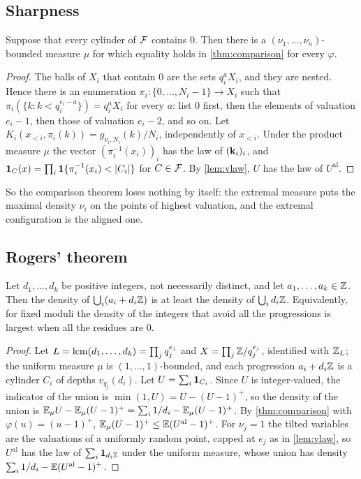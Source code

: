 \subsection{Sharpness}

\begin{proposition}\label{prop:sharp}
Suppose that every cylinder of $\mathcal{F}$ contains $0$. Then there is a $(\nu_1,\dots,\nu_n)$-bounded measure $\mu$ for
which equality holds in \cref{thm:comparison} for every $\varphi$.
\end{proposition}

\begin{proof}
The balls of $X_i$ that contain $0$ are the sets $q_i^aX_i$, and they are nested. Hence there is an enumeration
$\pi_i\colon\{0,\dots,N_i-1\}\to X_i$ such that $\pi_i(\{k:k<q_i^{e_i-a}\})=q_i^aX_i$ for every $a$: list $0$ first,
then the elements of valuation $e_i-1$, then those of valuation $e_i-2$, and so on. Let
$K_i(x_{<i},\pi_i(k))=g_{\nu_i,N_i}(k)/N_i$, independently of $x_{<i}$. Under the product measure $\mu$ the vector
$(\pi_i^{-1}(x_i))_i$ has the law of $(\mathbf{k}_i)_i$, and $\one_C(x)=\prod_i\one\{\pi_i^{-1}(x_i)<|C_i|\}$ for
$C\in\mathcal{F}$. By \cref{lem:vlaw}, $U$ has the law of $U^{\mathrm{al}}$.
\end{proof}

So the comparison theorem loses nothing by itself: the extremal measure puts the maximal density $\nu_i$ on the
points of highest valuation, and the extremal configuration is the aligned one.

\subsection{Rogers' theorem}\label{sec:rogers}

\begin{corollary}\label{cor:rogers}
Let $d_1,\dots,d_k$ be positive integers, not necessarily distinct, and let $a_1,\dots,a_k\in\mathbb{Z}$. Then the density
of $\bigcup_i(a_i+d_i\mathbb{Z})$ is at least the density of $\bigcup_id_i\mathbb{Z}$. Equivalently, for fixed moduli the density
of the integers that avoid all the progressions is largest when all the residues are $0$.
\end{corollary}

\begin{proof}
Let $L=\operatorname{lcm}(d_1,\dots,d_k)=\prod_jq_j^{e_j}$ and $X=\prod_j\mathbb{Z}/q_j^{e_j}$, identified with $\mathbb{Z}_L$; the uniform measure
$\mu$ is $(1,\dots,1)$-bounded, and each progression $a_i+d_i\mathbb{Z}$ is a cylinder $C_i$ of depths $v_{q_j}(d_i)$. Let
$U=\sum_i\mathbf{1}_{C_i}$. Since $U$ is integer-valued, the indicator of the union is $\min(1,U)=U-(U-1)^+$, so the
density of the union is $\mathbb{E}_\mu U-\mathbb{E}_\mu(U-1)^+=\sum_i1/d_i-\mathbb{E}_\mu(U-1)^+$. By \cref{thm:comparison} with
$\varphi(u)=(u-1)^+$, $\mathbb{E}_\mu(U-1)^+\le\mathbb{E}(U^{\mathrm{al}}-1)^+$. For $\nu_j=1$ the tilted variables are the
valuations of a uniformly random point, capped at $e_j$ as in \cref{lem:vlaw}, so $U^{\mathrm{al}}$ has the law of
$\sum_i\mathbf{1}_{d_i\mathbb{Z}}$ under the uniform measure, whose union has density $\sum_i1/d_i-\mathbb{E}(U^{\mathrm{al}}-1)^+$.
\end{proof}

